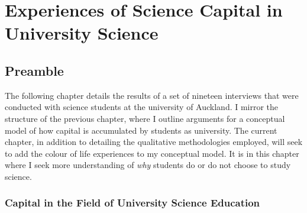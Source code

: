 \chapter{Experiences of Science Capital in University Science}

\section{Preamble}
The following chapter details the results of a set of nineteen interviews that were conducted with science students at the university of Auckland. I mirror the structure of the previous chapter, where I outline arguments for a conceptual model of how capital is accumulated by students as university. The current chapter, in addition to detailing the qualitative methodologies employed, will seek to add the colour of life experiences to my conceptual model. It is in this chapter where I seek more understanding of \textit{why} students do or do not choose to study science.

\subsection{Capital in the Field of University Science Education}



